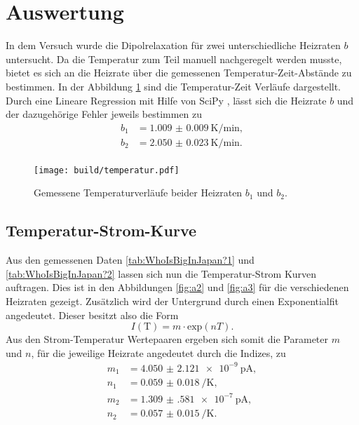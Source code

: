 \section{Auswertung}

In dem Versuch wurde die Dipolrelaxation für zwei unterschiedliche Heizraten $b$ untersucht. Da die Temperatur zum Teil manuell nachgeregelt werden musste, bietet es sich an die Heizrate über
die gemessenen Temperatur-Zeit-Abstände zu bestimmen. In der Abbildung \ref{fig:a1} sind die Temperatur-Zeit Verläufe dargestellt. Durch eine Lineare Regression mit Hilfe von SciPy \cite{scipy}, lässt sich die Heizrate $b$ und der dazugehörige Fehler jeweils bestimmen zu
\begin{align*}
    b_1 &= \SI{1.009(9)}{\kelvin\per\minute},\\
    b_2 &= \SI{2.050(23)}{\kelvin\per\minute}.\\
\end{align*}
\begin{figure}
    \centering
    \texttt{[image: build/temperatur.pdf]}
    \caption{Gemessene Temperaturverläufe beider Heizraten $b_1$ und $b_2$.
            }
    \label{fig:a1}
\end{figure}
\subsection{Temperatur-Strom-Kurve}

Aus den gemessenen Daten \ref{tab:WhoIsBigInJapan?1} und \ref{tab:WhoIsBigInJapan?2} lassen sich nun die Temperatur-Strom Kurven auftragen. Dies ist in den Abbildungen \ref{fig:a2} und \ref{fig:a3} für die verschiedenen Heizraten gezeigt. Zusätzlich wird der Untergrund durch einen Exponentialfit angedeutet. 
Dieser besitzt also die Form
\begin{equation*}
I(\text{T}) = m \cdot \text{exp} \left(nT\right).
\end{equation*}
Aus den Strom-Temperatur Wertepaaren ergeben sich somit die Parameter $m$ und $n$, für die jeweilige Heizrate angedeutet durch die Indizes, zu
\begin{align*}
m_1 &= \SI{4.050(2121)e-9}{\pico\ampere},\\  
n_1 &= \SI{0.059(18)}{\per\kelvin},\\ 
m_2 &= \SI{1.309(581)e-7}{\pico\ampere},\\ 
n_2 &= \SI{0.057(15)}{\per\kelvin}.\\ 
\end{align*}

